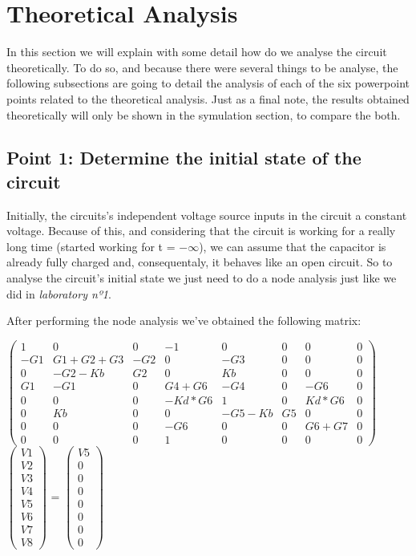 \section{Theoretical Analysis}
\label{sec:analysis}

In this section we will explain with some detail how do we analyse the circuit theoretically. To do so, and because there were several things to be analyse, the following subsections are going to detail the analysis of each of the six powerpoint points related to the theoretical analysis. Just as a final note, the results obtained theoretically will only be shown in the symulation section, to compare the both.

\subsection{Point 1: Determine the initial state of the circuit}

Initially, the circuits's independent voltage source inputs in the circuit a constant voltage. Because of this, and considering that the circuit is working for a really long time (started working for t = $-\infty$), we can assume that the capacitor is already fully charged and, consequentaly, it behaves like an open circuit. So to analyse the circuit's initial state we just need to do a node analysis just like we did in \textit{laboratory nº1}. 

After performing the node analysis we've obtained the following matrix:

$\begin{pmatrix}
1 & 0 & 0 & -1 & 0 & 0 & 0 & 0\\
-G1 & G1+G2+G3 & -G2 & 0 & -G3 & 0 & 0 & 0\\
0 & -G2-Kb & G2 & 0 & Kb & 0 & 0 & 0 \\
G1 & -G1 & 0 & G4+G6 & -G4 & 0 & -G6 & 0\\
0 & 0 & 0 & -Kd*G6 & 1 & 0 & Kd*G6 & 0 \\
0 & Kb & 0 & 0 & -G5-Kb & G5 & 0 & 0 \\
0 & 0 & 0 & -G6 & 0 & 0 & G6+G7 & 0  \\ 
0 & 0 & 0 & 1 & 0 & 0 & 0 & 0
\end{pmatrix}$
$\begin{pmatrix}
V1\\
V2\\
V3\\
V4\\
V5\\
V6\\
V7\\
V8
\end{pmatrix}$
=
$\begin{pmatrix}
V5\\
0\\
0\\
0\\
0\\
0\\
0\\
0
\end{pmatrix}$

